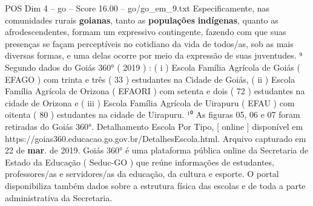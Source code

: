 \begin{textsample}{POS Dim 4 – go – Score 16.00 – go/go\_em\_9.txt}
Especificamente, nas comunidades rurais \textbf{goianas}, tanto as \textbf{populações} \textbf{indígenas}, quanto as afrodescendentes, formam um expressivo contingente, fazendo com que suas presenças se façam perceptíveis no cotidiano da vida de todos/as, sob as mais diversas formas, e uma delas ocorre por meio da expressão de suas juventudes. ⁹ Segundo dados do Goiás 360{\EmojiFont °} ( 2019 ) : ( i ) Escola Família Agrícola de Goiás ( EFAGO ) com trinta e três ( 33 ) estudantes na Cidade de Goiás, ( ii ) Escola Família Agrícola de Orizona ( EFAORI ) com setenta e dois ( 72 ) estudantes na cidade de Orizona e ( iii ) Escola Família Agrícola de Uirapuru ( EFAU ) com oitenta ( 80 ) estudantes na cidade de Uirapuru. ¹⁰ As figuras 05, 06 e 07 foram retiradas do Goiás 360{\EmojiFont °}.
Detalhamento Escola Por Tipo, [ online ] disponível em https://goias360.educacao.go.gov.br/DetalhesEscola.html.
Arquivo capturado em 22 de \textbf{mar}. de 2019.
Goiás 360{\EmojiFont °} é uma plataforma pública online da Secretaria de Estado da Educação ( Seduc-GO ) que reúne informações de estudantes, professores/as e servidores/as da educação, da cultura e esporte.
O portal disponibiliza também dados sobre a estrutura física das escolas e de toda a parte administrativa da Secretaria.

\end{textsample}
